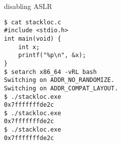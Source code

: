 
\begin{frame}[fragile,label=stackLoc2]{disabling ASLR}
\vspace{-.5cm}
\begin{Verbatim}[fontsize=\fontsize{9}{10}\selectfont]
$ cat stackloc.c
#include <stdio.h>
int main(void) {
    int x;
    printf("%p\n", &x);
}
$ setarch x86_64 -vRL bash
Switching on ADDR_NO_RANDOMIZE.
Switching on ADDR_COMPAT_LAYOUT.
$ ./stackloc.exe 
0x7fffffffde2c
$ ./stackloc.exe 
0x7fffffffde2c
$ ./stackloc.exe 
0x7fffffffde2c
\end{Verbatim}
\end{frame}
